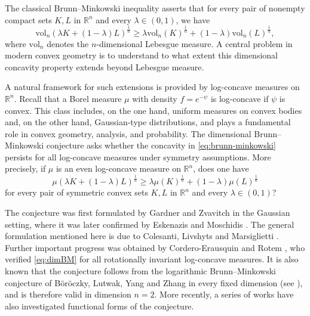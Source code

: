 \documentclass[11pt,leqno]{article}
\theoremstyle{definition}
\theoremstyle{remark}
\numberwithin{equation}{section}
\newcommand{\gr}{\geqslant}
\newcommand{\1}{\textbf{1}}
\newcommand{\R}{\mathbb{R}}
\newcommand{\vol}{\mathrm{vol}}
\begin{document}
The classical Brunn--Minkowski inequality asserts that for every pair of nonempty compact sets $K,L$ in $\mathbb{R}^n$ and every $\lambda\in(0,1)$, we have
\begin{equation} \label{eq:brunn-minkowski}
\vol_n(\lambda K+(1-\lambda) L)^{\frac{1}{n}} \gr \lambda\vol_n(K)^{\frac{1}{n}} + (1-\lambda)\vol_n(L)^{\frac{1}{n}},
\end{equation}
where $\vol_n$ denotes the $n$-dimensional Lebesgue measure. A central problem in modern convex geometry is to understand to what extent this dimensional concavity property extends beyond Lebesgue measure.

A natural framework for such extensions is provided by log-concave measures on $\mathbb{R}^n$. Recall that a Borel measure $\mu$ with density $f=e^{-\psi}$ is log-concave if $\psi$ is convex. This class includes, on the one hand, uniform measures on convex bodies and, on the other hand, Gaussian-type distributions, and plays a fundamental role in convex geometry, analysis, and probability. The dimensional Brunn--Minkowski conjecture asks whether the concavity in \eqref{eq:brunn-minkowski} persists for all log-concave measures under symmetry assumptions. More precisely, if $\mu$ is an even log-concave measure on $\mathbb{R}^n$, does one have
\begin{equation}\label{eq:dimBM}
\mu(\lambda K+(1-\lambda) L)^{\frac{1}{n}} \gr \lambda\mu(K)^{\frac{1}{n}}+(1-\lambda) \mu(L)^{\frac{1}{n}}
\end{equation}
for every pair of symmetric convex sets $K,L$ in $\R^n$ and every $\lambda\in(0,1)$?

The conjecture was first formulated by Gardner and Zvavitch \cite{Gardner-Zvavitch-2010} in the Gaussian setting, where it was later confirmed by Eskenazis and Moschidis \cite{Eskenazis-Moschidis-2021}. The general formulation mentioned here is due to Colesanti, Livshyts and Marsiglietti \cite{CLM17}. Further important progress was obtained by Cordero-Erausquin and Rotem \cite{Cordero-Rotem-2023}, who verified \eqref{eq:dimBM} for all rotationally invariant log-concave measures. It is also known that the conjecture follows from the logarithmic Brunn--Minkowski conjecture of B\"or\"oczky, Lutwak, Yang and Zhang \cite{BLYZ12} in every fixed dimension (see \cite{Livshyts-Marsiglietti-Nayar-Zvavitch-2017}), and is therefore valid in dimension $n=2$. More recently, a series of works \cite{AL25,Cordero-Eskenazis-2025,MMRR25} have also investigated functional forms of the conjecture.
\end{document}
